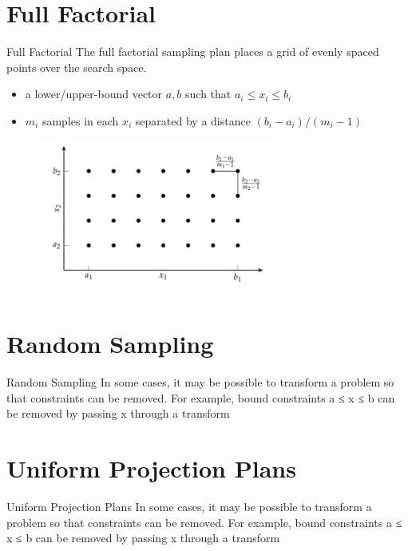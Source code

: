 \documentclass{beamer}
\begin{document}
\section{Full Factorial}
\begin{frame}{Full Factorial}
The full factorial sampling plan places a grid of evenly spaced points over the search space.
\begin{itemize}
    \item a lower/upper-bound vector $a, b$ such that $a_i \leq x_i \leq b_i$
    \item $m_i$ samples in each $x_i$ separated by a distance $(b_i-a_i)/(m_i-1)$
\end{itemize} 
\begin{figure}
\centering
\includegraphics[width=80mm]{Figs/grid_search.jpeg}
\end{figure} 

\end{frame}

\section{Random Sampling}
\begin{frame}{Random Sampling}
In some cases, it may be possible to transform a problem so that constraints can be removed. For example, bound constraints a ≤ x ≤ b can be removed by passing x through a transform

\end{frame}


\section{Uniform Projection Plans}
\begin{frame}{Uniform Projection Plans}
In some cases, it may be possible to transform a problem so that constraints can be removed. For example, bound constraints a ≤ x ≤ b can be removed by passing x through a transform

\end{frame}
\end{document}
